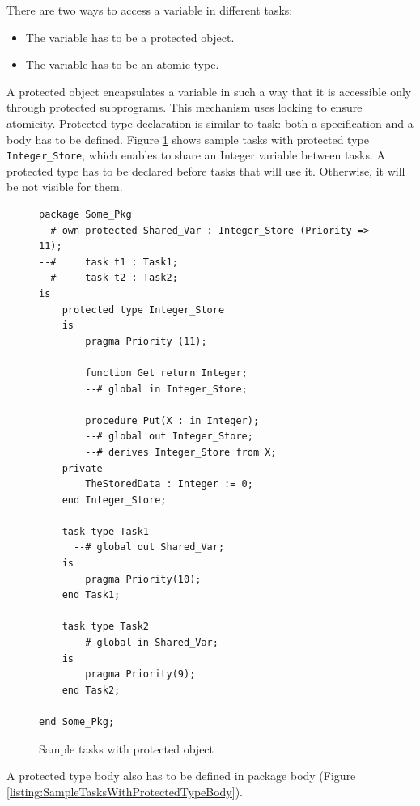There are two ways to access a variable in different tasks:
\begin{itemize}
    \item The variable has to be a protected object.
    \item The variable has to be an atomic type.
\end{itemize}

A protected object encapsulates a variable in such a way that it is accessible only through protected subprograms. This mechanism uses locking to ensure atomicity. Protected type declaration is similar to task: both a specification and a body has to be defined. Figure \ref{listing:SampleTasksWithProtectedType} shows sample tasks with protected type \lstinline{Integer_Store}, which enables to share an Integer variable between tasks. A protected type has to be declared before tasks that will use it. Otherwise, it will be not visible for them.

\begin{figure}
\singlespacing
\begin{lstlisting}[frame=single, gobble=0]
package Some_Pkg
--# own protected Shared_Var : Integer_Store (Priority => 11);
--#     task t1 : Task1;
--#     task t2 : Task2;
is
    protected type Integer_Store
    is
        pragma Priority (11);

        function Get return Integer;
        --# global in Integer_Store;

        procedure Put(X : in Integer);
        --# global out Integer_Store;
        --# derives Integer_Store from X;
    private
        TheStoredData : Integer := 0;
    end Integer_Store;

    task type Task1
      --# global out Shared_Var;
    is
        pragma Priority(10);
    end Task1;

    task type Task2
      --# global in Shared_Var;
    is
        pragma Priority(9);
    end Task2;

end Some_Pkg;
\end{lstlisting}
\doublespacing
\caption{Sample tasks with protected object}
\label{listing:SampleTasksWithProtectedType}
\end{figure}

A protected type body also has to be defined in package body (Figure \ref{listing:SampleTasksWithProtectedTypeBody}).

